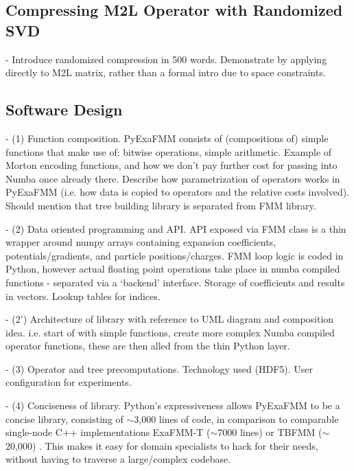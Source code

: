 \documentclass{IEEEcsmag}
\begin{document}
\subsection{Compressing M2L Operator with Randomized SVD}

- Introduce randomized compression in 500 words. Demonstrate by applying directly to M2L matrix, rather than a formal intro due to space constraints.

\subsection{Software Design}

- (1) Function composition. PyExaFMM consists of (compositions of) simple functions that make use of: bitwise operations, simple arithmetic. Example of Morton encoding functions, and how we don't pay further cost for passing into Numba once already there. Describe how parametrization of operators works in PyExaFMM (i.e. how data is copied to operators and the relative costs involved). Should mention that tree building library is separated from FMM library.


- (2) Data oriented programming and API. API exposed via FMM class is a thin wrapper around numpy arrays containing expansion coefficients, potentials/gradients, and particle positions/charges. FMM loop logic is coded in Python, however actual floating point operations take place in numba compiled functions - separated via a `backend' interface. Storage of coefficients and results in vectors. Lookup tables for indices.

- (2') Architecture of library with reference to UML diagram and composition idea. i.e. start of with simple functions, create more complex Numba compiled operator functions, these are then alled from the thin Python layer.

- (3) Operator and tree precomputations. Technology used (HDF5). User configuration for experiments.

- (4) Conciseness of library. Python's expressiveness allows PyExaFMM to be a concise library, consisting of $\sim$3,000 lines of code, in comparison to comparable single-node C++ implementations ExaFMM-T ($\sim$7000 lines) \cite{Wang2021} or TBFMM ($\sim$20,000) \cite{Bramas2020}. This makes it easy for domain specialists to hack for their needs, without having to traverse a large/complex codebase.
\end{document}

